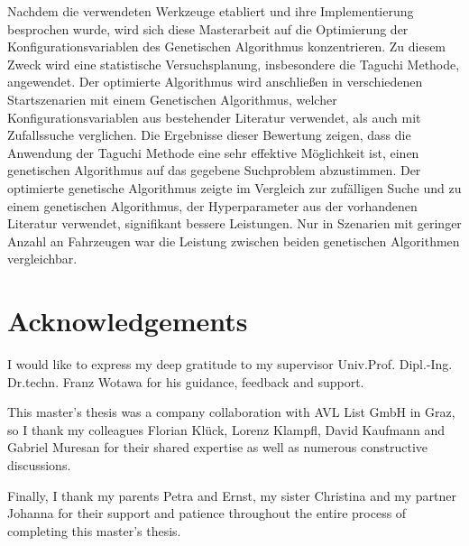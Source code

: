Nachdem die verwendeten Werkzeuge etabliert und ihre Implementierung besprochen wurde, wird sich diese Masterarbeit auf die Optimierung der Konfigurationsvariablen des Genetischen Algorithmus konzentrieren. Zu diesem Zweck wird eine statistische Versuchsplanung, insbesondere die Taguchi Methode, angewendet. Der optimierte Algorithmus wird anschließen in verschiedenen Startszenarien mit einem Genetischen Algorithmus, welcher Konfigurationsvariablen aus bestehender Literatur verwendet, als auch mit Zufallssuche verglichen. Die Ergebnisse dieser Bewertung zeigen, dass die Anwendung der Taguchi Methode eine sehr effektive Möglichkeit ist, einen genetischen Algorithmus auf das gegebene Suchproblem abzustimmen. Der optimierte genetische Algorithmus zeigte im Vergleich zur zufälligen Suche und zu einem genetischen Algorithmus, der Hyperparameter aus der vorhandenen Literatur verwendet, signifikant bessere Leistungen. Nur in Szenarien mit geringer Anzahl an Fahrzeugen war die Leistung zwischen beiden genetischen Algorithmen vergleichbar.

\chapter*{Acknowledgements}
\label{chap:acknowledgements}
I would like to express my deep gratitude to my supervisor Univ.Prof. Dipl.-Ing. Dr.techn. Franz Wotawa for his guidance, feedback and support.

This master's thesis was a company collaboration with AVL List GmbH in Graz, so I thank my colleagues Florian Klück, Lorenz Klampfl, David Kaufmann and Gabriel Muresan for their shared expertise as well as numerous constructive discussions.

Finally, I thank my parents Petra and Ernst, my sister Christina and my partner Johanna for their support and patience throughout the entire process of completing this master's thesis.



